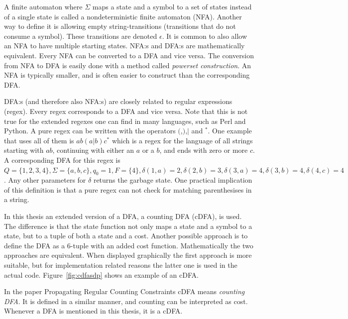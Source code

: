 \documentclass[a4paper,11pt]{article}
\begin{document}
A finite automaton where $\Sigma$ maps a state and a symbol to a set of states instead of a single state is called a nondeterministic finite automaton (NFA). Another way to define it is allowing empty string-transitions (transitions that do not consume a symbol). These transitions are denoted $\epsilon$. It is common to also allow an NFA to have multiple starting states. NFA:s and DFA:s are mathematically equivalent. Every NFA can be converted to a DFA and vice versa. The conversion from NFA to DFA is easily done with a method called \textit{powerset construction}. An NFA is typically smaller, and is often easier to construct than the corresponding DFA.

DFA:s (and therefore also NFA:s) are closely related to regular expressions (regex). Every regex corresponds to a DFA and vice versa. Note that this is not true for the extended regexes one can find in many languages, such as Perl and Python. A pure regex can be written with the operators $($,$)$,$|$ and $^{*}$. One example that uses all of them is $ab(a|b)c^{*}$ which is a regex for the language of all strings starting with $ab$, continuing with either an $a$ or a $b$, and ends with zero or more $c$. A corresponding DFA for this regex is $Q=\{1,2,3,4\}, \Sigma=\{a,b,c\}, q_0=1, F=\{4\}, \delta(1,a)=2, \delta(2,b)=3, \delta(3,a)=4, \delta(3,b)=4, \delta(4,c)=4$. Any other parameters for $\delta$ returns the garbage state. One practical implication of this definition is that a pure regex can not check for matching parenthesises in a string.

In this thesis an extended version of a DFA, a counting DFA (cDFA), is used. The difference is that the state function not only maps a state and a symbol to a state, but to a tuple of both a state and a cost. Another possible approach is to define the DFA as a 6-tuple with an added cost function. Mathematically the two approaches are equivalent. When displayed graphically the first approach is more suitable, but for implementation related reasons the latter one is used in the actual code. Figure~\ref{fig:cdfasdp} shows an example of an cDFA.

In the paper Propagating Regular Counting Constraints cDFA means \textit{counting DFA}. It is defined in a similar manner, and counting can be interpreted as cost. Whenever a DFA is mentioned in this thesis, it is a cDFA.
\end{document}
